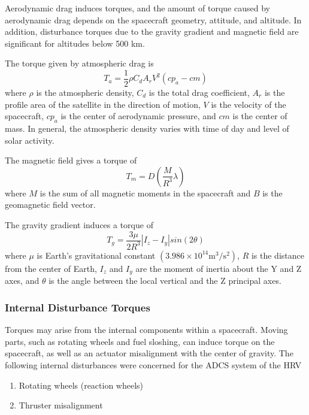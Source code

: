 \documentclass[paper=letter, fontsize=11pt]{scrartcl} %
\numberwithin{equation}{section} %
\numberwithin{figure}{section} %
\numberwithin{table}{section} %
\begin{document}
\bigskip \par Aerodynamic drag induces torques, and the amount of torque caused by aerodynamic drag depends on the spacecraft geometry, attitude, and altitude. In addition, disturbance torques due to the gravity gradient and magnetic field are significant for altitudes below 500 km.

\bigskip \noindent The torque given by atmospheric drag is
\begin{equation*}
    T_a = \frac{1}{2}\rho C_d A_r V^{2}(cp_a - cm)
    \label{equation:ta}
\end{equation*}
where $\rho$ is the atmospheric density, $C_d$ is the total drag coefficient, $A_r$ is the profile area of the satellite in the direction of motion, $V$ is the velocity of the spacecraft, $cp_a$ is the center of aerodynamic pressure, and $cm$ is the center of mass. In general, the atmospheric density varies with time of day and level of solar activity.

\noindent The magnetic field gives a torque of
\begin{equation*}
    T_m = D\left(\frac{M}{R^{3}}\lambda\right)
    \label{equation:tm}
\end{equation*}
where $M$ is the sum of all magnetic moments in the spacecraft and $B$ is the geomagnetic field vector.

\noindent The gravity gradient induces a torque of
\begin{equation*}
    T_g = \frac{3\mu}{2R^{3}} | I_z - I_y | sin(2\theta)
    \label{equation:tg}
\end{equation*}
where $\mu$ is Earth's gravitational constant $(3.986 \times 10^{14} \mathrm{m^{3}/s^{2}})$, $R$ is the distance from the center of Earth, $I_z$ and $I_y$ are the moment of inertia about the Y and Z axes, and $\theta$ is the angle between the local vertical and the Z principal axes.

\subsubsection{Internal Disturbance Torques}
Torques may arise from the internal components within a spacecraft. Moving parts, such as rotating wheels and fuel sloshing, can induce torque on the spacecraft, as well as an actuator misalignment with the center of gravity. The following internal disturbances were concerned for the ADCS system of the HRV

\begin{enumerate}
    \item Rotating wheels (reaction wheels)
    \item Thruster misalignment
\end{enumerate}
\end{document}
